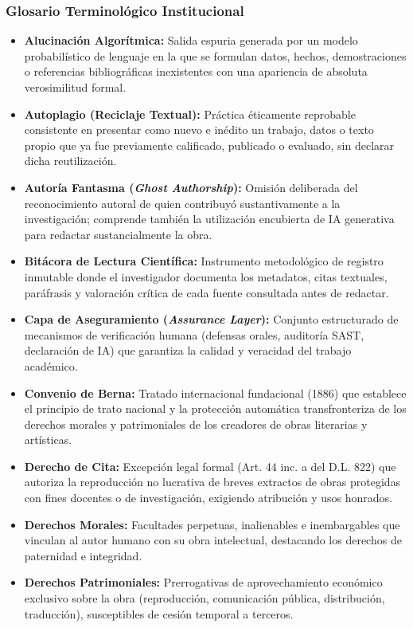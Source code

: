 \subsubsection{Glosario Terminológico Institucional}

\begin{itemize}
    \item \textbf{Alucinación Algorítmica:} Salida espuria generada por un modelo probabilístico de lenguaje en la que se formulan datos, hechos, demostraciones o referencias bibliográficas inexistentes con una apariencia de absoluta verosimilitud formal.
    \item \textbf{Autoplagio (Reciclaje Textual):} Práctica éticamente reprobable consistente en presentar como nuevo e inédito un trabajo, datos o texto propio que ya fue previamente calificado, publicado o evaluado, sin declarar dicha reutilización.
    \item \textbf{Autoría Fantasma (\textit{Ghost Authorship}):} Omisión deliberada del reconocimiento autoral de quien contribuyó sustantivamente a la investigación; comprende también la utilización encubierta de IA generativa para redactar sustancialmente la obra.
    \item \textbf{Bitácora de Lectura Científica:} Instrumento metodológico de registro inmutable donde el investigador documenta los metadatos, citas textuales, paráfrasis y valoración crítica de cada fuente consultada antes de redactar.
    \item \textbf{Capa de Aseguramiento (\textit{Assurance Layer}):} Conjunto estructurado de mecanismos de verificación humana (defensas orales, auditoría SAST, declaración de IA) que garantiza la calidad y veracidad del trabajo académico.
    \item \textbf{Convenio de Berna:} Tratado internacional fundacional (1886) que establece el principio de trato nacional y la protección automática transfronteriza de los derechos morales y patrimoniales de los creadores de obras literarias y artísticas.
    \item \textbf{Derecho de Cita:} Excepción legal formal (Art. 44 inc. a del D.L. 822) que autoriza la reproducción no lucrativa de breves extractos de obras protegidas con fines docentes o de investigación, exigiendo atribución y usos honrados.
    \item \textbf{Derechos Morales:} Facultades perpetuas, inalienables e inembargables que vinculan al autor humano con su obra intelectual, destacando los derechos de paternidad e integridad.
    \item \textbf{Derechos Patrimoniales:} Prerrogativas de aprovechamiento económico exclusivo sobre la obra (reproducción, comunicación pública, distribución, traducción), susceptibles de cesión temporal a terceros.

\end{itemize}
